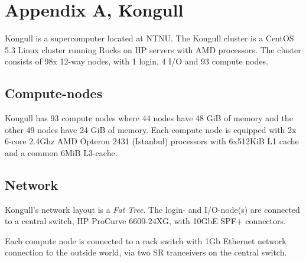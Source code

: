 \section{Appendix A, Kongull} %
\label{sec:appendix_kongull}
Kongull is a supercomputer located at NTNU. The Kongull cluster is a CentOS 5.3 Linux cluster running Rocks on HP servers with AMD processors. The cluster consists of 98x 12-way nodes, with 1 login, 4 I/O and 93 compute nodes.

\subsection{Compute-nodes} %
\label{sub:compute_nodes}
Kongull has 93 compute nodes where 44 nodes have 48 GiB of memory and the other 49 nodes have 24 GiB of memory. Each compute node is equipped with 2x 6-core 2.4Ghz AMD Opteron 2431 (Istanbul) processors with 6x512KiB L1 cache and a common 6MiB L3-cache. 

\subsection{Network} %
\label{sub:network}
Kongull's network layout is a \emph{Fat Tree}. The login- and I/O-node(s) are connected to a central switch, HP ProCurve 6600-24XG, with 10GbE SPF+ connectors. 

Each compute node is connected to a rack switch with 1Gb Ethernet network connection to the outside world, via two SR tranceivers on the central switch. 

